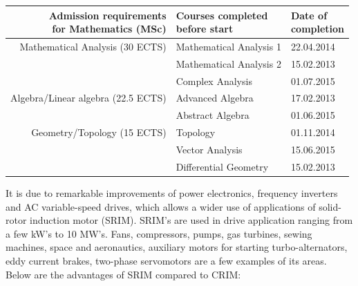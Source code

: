   \begin{tabular}{rll} \toprule
    \parbox[t]{5cm}{\textbf{Admission requirements                            \\ for Mathematics (MSc)}}  & \parbox[t]{5cm}{\textbf{Courses completed \\ before start}} & \parbox[t]{2.5cm}{\textbf{Date of \\ completion}} \\  \midrule
    Mathematical Analysis (30 ECTS)    & Mathematical Analysis 1 & 22.04.2014 \\
    ~                                  & Mathematical Analysis 2 & 15.02.2013 \\
    ~                                  & Complex Analysis        & 01.07.2015 \\ \midrule
    Algebra/Linear algebra (22.5 ECTS) & Advanced Algebra        & 17.02.2013 \\
    ~                                  & Abstract Algebra        & 01.06.2015 \\ \midrule
    Geometry/Topology (15 ECTS)        & Topology                & 01.11.2014 \\
    ~                                  & Vector Analysis         & 15.06.2015 \\
    ~                                  & Differential Geometry   & 15.02.2013 \\ \bottomrule
  \end{tabular}


It is due to remarkable improvements of power electronics, frequency inverters and AC
variable-speed drives, which allows a wider use of applications of solid-rotor induction motor
(SRIM). SRIM's are used in drive application ranging from a few kW's to 10 MW's. Fans,
compressors, pumps, gas turbines, sewing machines, space and aeronautics, auxiliary motors for
starting turbo-alternators, eddy current brakes, two-phase servomotors are a few examples of its
areas. \\

Below are the advantages of SRIM compared to CRIM:

